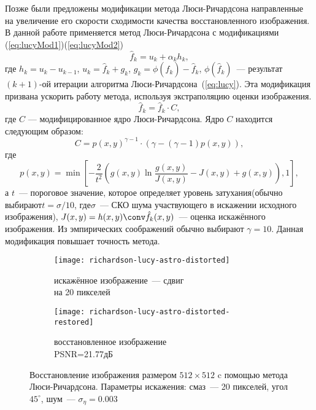 Позже были предложены модификации метода Люси-Ричардсона \cite{richardsonLucyModifiedBiggs} направленные на увеличение его скорости сходимости качества восстановленного изображения. В данной работе применяется метод Люси-Ричардсона с модификациями (\ref{eq:lucyMod1})(\ref{eq:lucyMod2})
\begin{equation}\label{eq:lucyMod1}
	\hat{f}_k=u_k+\alpha_k h_k,
\end{equation}
где $h_k = u_k - u_{k-1}$, $u_k = \hat{f}_k + g_k$, $g_k = \phi(\hat{f}_k)-\hat{f}_k$, $\phi(\hat{f}_k)$~--- результат $(k+1)$-ой итерации алгоритма Люси-Ричардсона~(\ref{eq:lucy}). Эта модификация призвана ускорить работу метода, используя экстраполяцию оценки изображения.   
\begin{equation}\label{eq:lucyMod2}
	\hat{f}_k=\hat{f}_k \cdot C,
\end{equation}
где $C$ — модифицированное ядро Люси-Ричардсона. Ядро $C$ находится следующим образом:
\begin{equation}
	C = p(x,y)^{\gamma-1}\cdot (\gamma-(\gamma-1)p(x,y)),
\end{equation}
где
\begin{equation}
	p(x,y) = \min\left[
		-\frac{2}{t^2}\left(
			g(x,y)\ln\frac{g(x,y)}{J(x,y)}-J(x,y)+g(x,y)
		\right), 1
	\right],
\end{equation}
а $t$~--- пороговое значение, которое определяет уровень затухания(обычно выбирают$t=\sigma/10$, где$\sigma$~--- СКО шума участвующего в искажении исходного изображения), $J(x,y) =h(x,y) \conv \hat{f}_k(x,y)$~--- оценка искажённого изображения. Из эмпирических соображений обычно выбирают $\gamma=10$. Данная модификация повышает точность метода. 

\begin{figure}[h!]
	\begin{subfigure}[b]{0.5\textwidth}
		\texttt{[image: richardson-lucy-astro-distorted]}
		\caption{искажённое изображение~--- сдвиг \\на 20 пикселей}
		\label{fig:astroLucyBlurred}
	\end{subfigure}%
	\begin{subfigure}[b]{0.5\textwidth}
		\texttt{[image: richardson-lucy-astro-distorted-restored]}
		\caption{восстановленное изображение\\ PSNR=21.77дБ}
		\label{fig:astroLucyRestored}
	\end{subfigure}%
	\caption{Восстановление изображения размером $512\times 512$ c помощью метода Люси-Ричардсона. Параметры искажения: смаз~--- 20 пикселей, угол $45^\circ$, шум~--- $\sigma_\eta=0.003$}
	\label{fig:richardsonLucy}
\end{figure}

